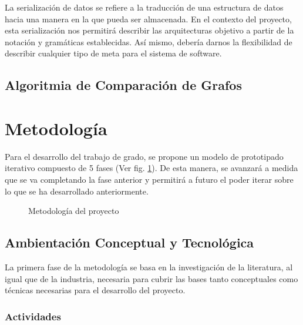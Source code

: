 \documentclass[12pt]{article}
\begin{document}
    La serialización de datos se refiere a la traducción de una estructura de datos hacia una manera en la que pueda ser almacenada. En el contexto del proyecto, esta serialización nos permitirá describir las arquitecturas objetivo a partir de la notación y gramáticas establecidas. Así mismo, debería darnos la flexibilidad de describir cualquier tipo de meta para el sistema de software.
    

    \subsection{Algoritmia de Comparación de Grafos} %



    \pagebreak

    \section{Metodología}

    Para el desarrollo del trabajo de grado, se propone un modelo de prototipado iterativo compuesto de 5 fases (Ver fig. \ref{fig:met}). De esta manera, se avanzará a medida que se va completando la fase anterior y permitirá a futuro el poder iterar sobre lo que se ha desarrollado anteriormente.

    \begin{figure}[H]
        \centering
        
        \caption{Metodología del proyecto}
        \label{fig:met}
    \end{figure}

    \subsection{Ambientación Conceptual y Tecnológica}

    La primera fase de la metodología se basa en la investigación de la literatura, al igual que de la industria, necesaria para cubrir las bases tanto conceptuales como técnicas necesarias para el desarrollo del proyecto. 

    \subsubsection*{Actividades}
\end{document}
